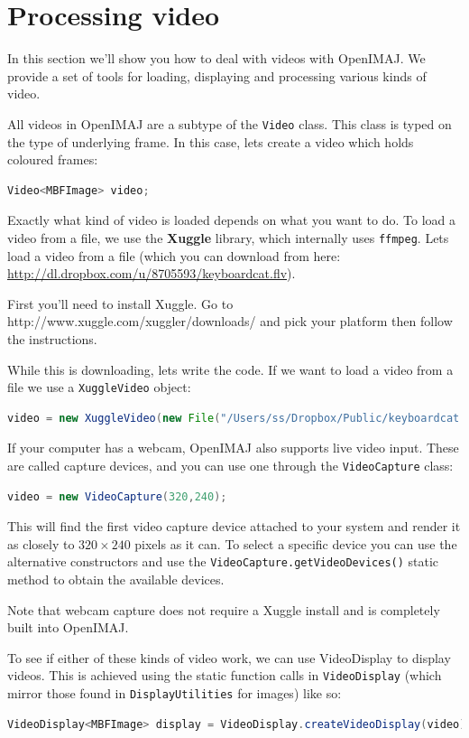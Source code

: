\documentclass[10pt,a4paper,twoside,extrafontsizes]{memoir}
\begin{document}
\chapter{Processing video}
In this section we'll show you how to deal with videos with OpenIMAJ. We provide a 
set of tools for loading, displaying and processing various kinds of video. 

All videos in OpenIMAJ are a subtype of the \verb+Video+ class. This class is typed 
on the type of underlying frame. In this case, lets create a video which holds coloured frames:
\begin{lstlisting}[language=java]
Video<MBFImage> video;
\end{lstlisting}

Exactly what kind of video is loaded depends on what you want to do. To load a video from a file, 
we use the \textbf{Xuggle} library, which internally uses \verb+ffmpeg+. Lets load a video 
from a file (which you can download from here: \url{http://dl.dropbox.com/u/8705593/keyboardcat.flv}).

First you'll need to install Xuggle. Go to http://www.xuggle.com/xuggler/downloads/ and pick your platform 
then follow the instructions.

While this is downloading, lets write the code. If we want to load a video from a file we use a 
\verb+XuggleVideo+ object:
\begin{lstlisting}[language=java]
video = new XuggleVideo(new File("/Users/ss/Dropbox/Public/keyboardcat.flv"));
\end{lstlisting}

If your computer has a webcam, OpenIMAJ also supports live video input. These are called capture 
devices, and you can use one through the \verb+VideoCapture+ class:
\begin{lstlisting}[language=java]
video = new VideoCapture(320,240);
\end{lstlisting}
This will find the first video capture device attached to your system and render it as closely to 
$320\times240$ pixels as it can. To select a specific device you can use the alternative constructors
and use the \verb+VideoCapture.getVideoDevices()+ static method to obtain the available devices.

Note that webcam capture does not require a Xuggle install and is completely built into OpenIMAJ.

To see if either of these kinds of video work, we can use VideoDisplay to display videos. This is 
achieved using the static function calls in \verb+VideoDisplay+ (which mirror those found in 
\verb+DisplayUtilities+ for images) like so:
\begin{lstlisting}[language=java]
VideoDisplay<MBFImage> display = VideoDisplay.createVideoDisplay(video);
\end{lstlisting}
\end{document}
